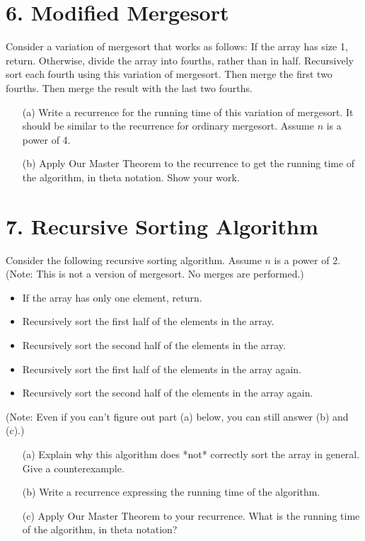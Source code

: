 \documentclass{article}
\begin{document}
\section*{6. Modified Mergesort}

Consider a variation of mergesort that works as follows: If the array has size 1, return. Otherwise, divide the array into fourths, rather than in half. Recursively sort each fourth using this variation of mergesort. Then merge the first two fourths. Then merge the result with the last two fourths.

\begin{enumerate}
    \item[(a)] Write a recurrence for the running time of this variation of mergesort.  It should be similar to the recurrence for ordinary mergesort. Assume $n$ is a power of 4.
    \item[(b)] Apply Our Master Theorem to the recurrence to get the running time of the algorithm, in theta notation. Show your work.
\end{enumerate}

\section*{7. Recursive Sorting Algorithm}

Consider the following recursive sorting algorithm. Assume $n$ is a power of 2. (Note: This is not a version of mergesort. No merges are performed.)

\begin{itemize}
    \item If the array has only one element, return.
    \item Recursively sort the first half of the elements in the array.
    \item Recursively sort the second half of the elements in the array.
    \item Recursively sort the first half of the elements in the array again.
    \item Recursively sort the second half of the elements in the array again.
\end{itemize}
(Note: Even if you can’t figure out part (a) below, you can still answer (b) and (c).)

\begin{enumerate}
    \item[(a)]  Explain why this algorithm does *not* correctly sort the array in general. Give a counterexample.
    \item[(b)] Write a recurrence expressing the running time of the algorithm.
    \item[(c)] Apply Our Master Theorem to your recurrence. What is the running time of the algorithm, in theta notation?
\end{enumerate}
\end{document}
